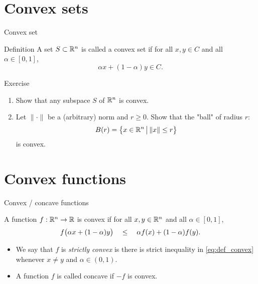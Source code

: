 \documentclass{beamer}
\begin{document}
\section{Convex sets}

\begin{frame}[t]{Convex set}
	\grid

	\vspace{-0.4cm}
	\begin{block}{Definition}
		A set $S \subset \mathbb{R}^n$ is called a convex set if for all $x,y \in C$ and all $\alpha \in [0,1]$,
		$$
		\alpha x + (1-\alpha) y \in C.
		$$
	\end{block}

\end{frame}

\begin{frame}[t]{Exercise}
	\grid

	\vspace{-0.3cm}
	\begin{enumerate}
		\item Show that any subspace $S$ of $\mathbb{R}^n$ is convex.
		\item Let $\| \cdot \|$ be a (arbitrary) norm and $r \geq 0$.
			Show that the "ball" of radius $r$:
			$$
			B(r) = \big\{ x \in \mathbb{R}^n \, \big| \, \|x\| \leq r \big\}
			$$
			is convex.
	\end{enumerate}

\end{frame}

\section{Convex functions}

\begin{frame}[t]{Convex / concave functions}
	\grid

	\vspace{-0.5cm}

	\begin{definition}
		A function $f: \mathbb{R}^n \to \mathbb{R}$ is convex if for all $x,y \in \mathbb{R}^n$ and all $\alpha \in [0,1]$,
		\begin{equation}\label{eq:def_convex}
			f\big(\alpha x + (1-\alpha) y\big) \ \ \ \leq \ \ \ \alpha f(x) + (1-\alpha) f(y).
	\vspace{-0.3cm}
		\end{equation}
	\end{definition}
	\vspace{-0.1cm}
	\begin{itemize}
		\item We say that $f$ is \emph{strictly convex} is there is strict inequality in \eqref{eq:def_convex} whenever $x \neq y$ and $\alpha \in (0,1)$.
		\item A function $f$ is called concave if $-f$ is convex.
	\end{itemize}
\end{frame}
\end{document}
